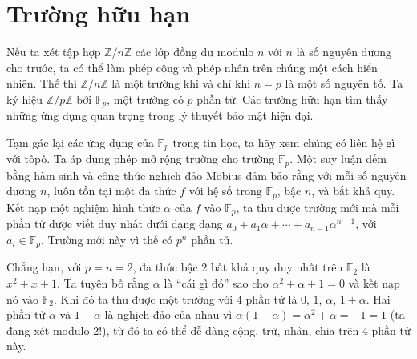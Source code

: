 \documentclass[12pt]{article}
\begin{document}
\section{Trường hữu hạn}

Nếu ta xét tập hợp $\mathbb{Z}/n\mathbb{Z}$ các lớp đồng dư modulo $n$ với $n$ là số nguyên dương cho trước, ta có thể làm phép cộng và phép nhân trên chúng một cách hiển nhiên. Thế thì $\mathbb{Z}/n\mathbb{Z}$ là một trường khi và chỉ khi $n = p$ là một số nguyên tố. Ta ký hiệu $\mathbb{Z}/p\mathbb{Z}$ bởi $\mathbb{F}_p$, một trường có $p$ phần tử. Các trường hữu hạn tìm thấy những ứng dụng quan trọng trong lý thuyết bảo mật hiện đại. 

Tạm gác lại các ứng dụng của $\mathbb{F}_p$ trong tin học, ta hãy xem chúng có liên hệ gì với tôpô. Ta áp dụng phép mở rộng trường cho trường $\mathbb{F}_p$. Một suy luận đếm bằng hàm sinh và công thức nghịch đảo M\"obius đảm bảo rằng với mỗi số nguyên dương $n$, luôn tồn tại một đa thức $f$ với hệ số trong $\mathbb{F}_p$, bậc $n$, và bất khả quy. Kết nạp một nghiệm hình thức $\alpha$ của $f$ vào $\mathbb{F}_p$, ta thu được trường mới mà mỗi phần tử được viết duy nhất dưới dạng dạng $a_0+a_1\alpha+\cdots+a_{n-1}\alpha^{n-1}$, với $a_i \in \mathbb{F}_p$. Trường mới này vì thế có $p^n$ phần tử.

Chẳng hạn, với $p = n = 2$, đa thức bậc $2$ bất khả quy duy nhất trên $\mathbb{F}_2$ là $x^2+x+1$. Ta tuyên bố rằng $\alpha$ là ``cái gì đó'' sao cho $\alpha^2 + \alpha + 1 = 0$ và kết nạp nó vào $\mathbb{F}_2$. Khi đó ta thu được một trường với $4$ phần tử là $0$, $1$, $\alpha$, $1 + \alpha$. Hai phần tử $\alpha$ và $1 + \alpha$ là nghịch đảo của nhau vì $\alpha(1 + \alpha) = \alpha^2 + \alpha = -1 = 1$ (ta đang xét modulo $2$!), từ đó ta có thể dễ dàng cộng, trừ, nhân, chia trên $4$ phần tử này.
\end{document}
